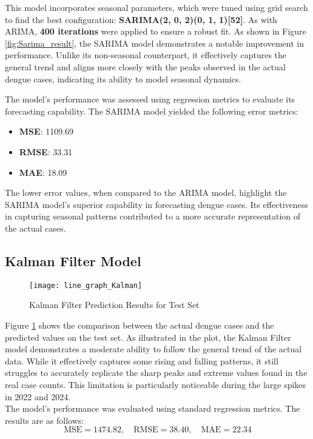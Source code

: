 This model incorporates seasonal parameters, which were tuned using grid search to find the best configuration: \textbf{SARIMA(2, 0, 2)(0, 1, 1)[52]}. As with ARIMA, \textbf{400 iterations} were applied to ensure a robust fit. As shown in Figure \ref{fig:Sarima_result}, the SARIMA model demonstrates a notable improvement in performance. Unlike its non-seasonal counterpart, it effectively captures the general trend and aligns more closely with the peaks observed in the actual dengue cases, indicating its ability to model seasonal dynamics.

The model's performance was assessed using regression metrics to evaluate its forecasting capability. The SARIMA model yielded the following error metrics: \begin{itemize} \item \textbf{MSE}: 1109.69 \item \textbf{RMSE}: 33.31 \item \textbf{MAE}: 18.09 \end{itemize} The lower error values, when compared to the ARIMA model, highlight the SARIMA model's superior capability in forecasting dengue cases. Its effectiveness in capturing seasonal patterns contributed to a more accurate representation of the actual cases.



\subsection{Kalman Filter Model}

\begin{figure}[H]
	\centering
	\texttt{[image: line\_graph\_Kalman]}
	\caption{Kalman Filter Prediction Results for Test Set}
	\label{fig:Kalman_result}
\end{figure}

Figure \ref{fig:Kalman_result} shows the comparison between the actual dengue cases and the predicted values on the test set. As illustrated in the plot, the Kalman Filter model demonstrates a moderate ability to follow the general trend of the actual data. While it effectively captures some rising and falling patterns, it still struggles to accurately replicate the sharp peaks and extreme values found in the real case counts. This limitation is particularly noticeable during the large spikes in 2022 and 2024.
\\

The model’s performance was evaluated using standard regression metrics. The results are as follows:
\[
\text{MSE} = 1474.82, \quad
\text{RMSE} = 38.40, \quad
\text{MAE} = 22.34
\]

